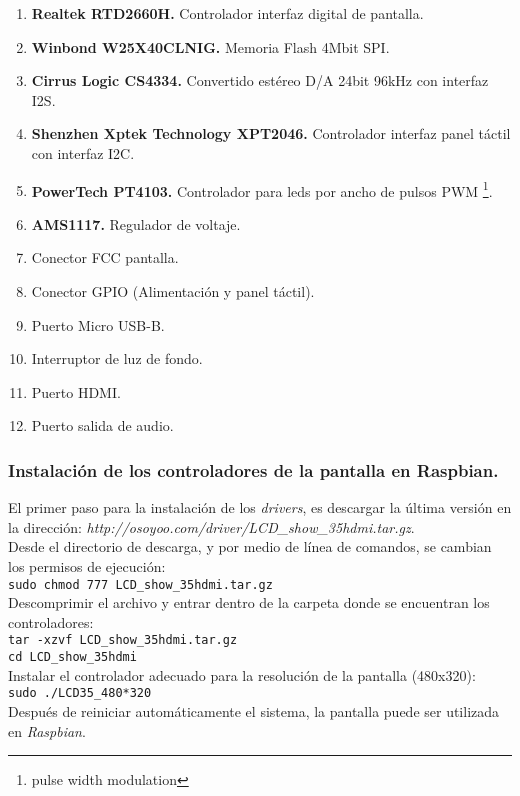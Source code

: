 \begin{enumerate}
\item \textbf{Realtek RTD2660H.} Controlador interfaz digital de pantalla.
\item \textbf{Winbond W25X40CLNIG.} Memoria Flash 4Mbit SPI.
\item \textbf{Cirrus Logic CS4334.} Convertido estéreo D/A 24bit 96kHz con interfaz I2S.
\item \textbf{Shenzhen Xptek Technology XPT2046.} Controlador interfaz panel táctil con interfaz I2C.
\item \textbf{PowerTech PT4103.} Controlador para leds por ancho de pulsos PWM \footnote{pulse width modulation}. 
\item \textbf{AMS1117.} Regulador de voltaje.
\item Conector FCC pantalla.
\item Conector GPIO (Alimentación y panel táctil).
\item Puerto Micro USB-B.
\item Interruptor de luz de fondo.
\item Puerto HDMI.
\item Puerto salida de audio.
\end{enumerate}

\subsubsection{Instalación de los controladores de la pantalla en Raspbian.}
El primer paso para la instalación de los \emph{drivers}, es descargar la última versión en la dirección: \emph{http://osoyoo.com/driver/LCD\_show\_35hdmi.tar.gz}.\\
Desde el directorio de descarga, y por medio de línea de comandos, se cambian los permisos de ejecución:\\
\colorbox[gray]{0.85}{\texttt{sudo chmod 777 LCD\_show\_35hdmi.tar.gz}}\\
Descomprimir el archivo y entrar dentro de la carpeta donde se encuentran los controladores:\\
\colorbox[gray]{0.85}{\texttt{tar -xzvf LCD\_show\_35hdmi.tar.gz}}\\
\colorbox[gray]{0.85}{\texttt{cd LCD\_show\_35hdmi}}\\
Instalar el controlador adecuado para la resolución de la pantalla (480x320):\\
\colorbox[gray]{0.85}{\texttt{sudo ./LCD35\_480*320}}\\
Después de reiniciar automáticamente el sistema, la pantalla puede ser utilizada en \emph{Raspbian}.



